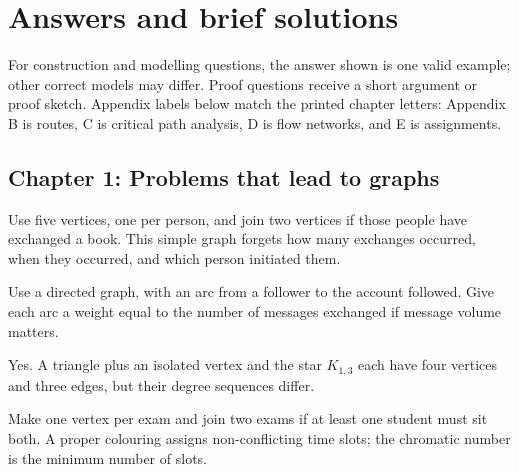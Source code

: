\chapter*{Answers and brief solutions}
For construction and modelling questions, the answer shown is one valid example; other correct models may differ. Proof questions receive a short argument or proof sketch. Appendix labels below match the printed chapter letters: Appendix B is routes, C is critical path analysis, D is flow networks, and E is assignments.

\section*{Chapter 1: Problems that lead to graphs}
\begin{description}[style=nextline]
\item[1.1] Use five vertices, one per person, and join two vertices if those people have exchanged a book. This simple graph forgets how many exchanges occurred, when they occurred, and which person initiated them.
\item[1.2] Use a directed graph, with an arc from a follower to the account followed. Give each arc a weight equal to the number of messages exchanged if message volume matters.
\item[1.3] Yes. A triangle plus an isolated vertex and the star $K_{1,3}$ each have four vertices and three edges, but their degree sequences differ.
\item[1.4] Make one vertex per exam and join two exams if at least one student must sit both. A proper colouring assigns non-conflicting time slots; the chromatic number is the minimum number of slots.
\end{description}


